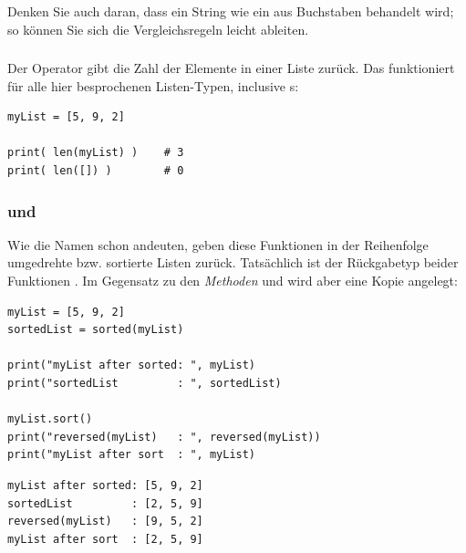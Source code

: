 Denken Sie auch daran, dass ein String wie ein  aus Buchstaben behandelt wird; so können Sie sich die Vergleichsregeln leicht ableiten.


\subsubsection{}
Der Operator  gibt die Zahl der Elemente in einer Liste zurück. Das funktioniert für alle hier besprochenen Listen-Typen, inclusive s:


\begin{codebox}
\begin{verbatim}
myList = [5, 9, 2]

print( len(myList) )    # 3
print( len([]) )        # 0
\end{verbatim}
\end{codebox}



\subsubsection{ und }
Wie die Namen schon andeuten, geben diese Funktionen in der Reihenfolge umgedrehte bzw. sortierte Listen zurück. Tatsächlich ist der Rückgabetyp beider Funktionen . Im Gegensatz zu den \emph{Methoden}  und  wird aber eine Kopie angelegt:

\begin{codebox}
\begin{verbatim}
myList = [5, 9, 2]
sortedList = sorted(myList)

print("myList after sorted: ", myList)
print("sortedList         : ", sortedList)

myList.sort()
print("reversed(myList)   : ", reversed(myList))
print("myList after sort  : ", myList)
\end{verbatim}
\end{codebox}

\begin{cmdbox}[Ausgabe]
\begin{verbatim}
myList after sorted: [5, 9, 2]
sortedList         : [2, 5, 9]
reversed(myList)   : [9, 5, 2]
myList after sort  : [2, 5, 9]
\end{verbatim}
\end{cmdbox}

